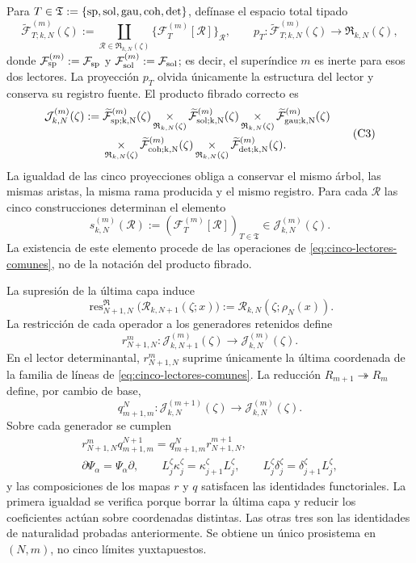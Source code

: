 Para
\(T\in\mathfrak T:=\{{\rm sp},{\rm sol},{\rm gau},{\rm coh},{\rm det}\}\),
defínase el espacio total tipado
\[
 \widetilde{\mathcal F}_{T;k,N}^{(m)}(\zeta)
 :=\coprod_{\mathscr R\in\mathfrak R_{k,N}(\zeta)}
   \{\mathcal F_T^{(m)}[\mathscr R]\}_{\mathscr R},
 \qquad
 p_T:\widetilde{\mathcal F}_{T;k,N}^{(m)}(\zeta)
      \longrightarrow\mathfrak R_{k,N}(\zeta),
\]
donde
\(\mathcal F_{\rm sp}^{(m)}:=\mathcal F_{\rm sp}\) y
\(\mathcal F_{\rm sol}^{(m)}:=\mathcal F_{\rm sol}\); es decir, el
superíndice \(m\) es inerte para esos dos lectores.
La proyección \(p_T\) olvida únicamente la estructura del lector y conserva
su registro fuente. El producto fibrado correcto es
\[
\begin{aligned}
 \mathcal J_{k,N}^{(m)}(\zeta):={}&
 \widetilde{\mathcal F}_{\rm sp;k,N}^{(m)}(\zeta)
 \mathop{\times}_{\mathfrak R_{k,N}(\zeta)}
 \widetilde{\mathcal F}_{\rm sol;k,N}^{(m)}(\zeta)
 \mathop{\times}_{\mathfrak R_{k,N}(\zeta)}
 \widetilde{\mathcal F}_{\rm gau;k,N}^{(m)}(\zeta)\\
 &\mathop{\times}_{\mathfrak R_{k,N}(\zeta)}
 \widetilde{\mathcal F}_{\rm coh;k,N}^{(m)}(\zeta)
 \mathop{\times}_{\mathfrak R_{k,N}(\zeta)}
 \widetilde{\mathcal F}_{\rm det;k,N}^{(m)}(\zeta).
\end{aligned}
\tag{C3}
\label{eq:constructor-correlativo}
\]
La igualdad de las cinco proyecciones obliga a conservar el mismo árbol, las
mismas aristas, la misma rama producida y el mismo registro. Para cada
\(\mathscr R\) las cinco construcciones determinan el elemento
\[
 s_{k,N}^{(m)}(\mathscr R)
 :=(\mathcal F_T^{(m)}[\mathscr R])_{T\in\mathfrak T}
 \in\mathcal J_{k,N}^{(m)}(\zeta).
\]
La existencia de este elemento procede de las operaciones de
\eqref{eq:cinco-lectores-comunes}, no de la
notación del producto fibrado.

La supresión de la última capa induce
\[
 \operatorname{res}^{\mathfrak R}_{N+1,N}
 \bigl(\mathscr R_{k,N+1}(\zeta;x)\bigr)
 :=\mathscr R_{k,N}(\zeta;\rho_N(x)).
\]
La restricción de cada operador a los generadores retenidos define
\[
 r^m_{N+1,N}:\mathcal J_{k,N+1}^{(m)}(\zeta)
 \longrightarrow\mathcal J_{k,N}^{(m)}(\zeta).
\]
En el lector determinantal, \(r^m_{N+1,N}\) suprime únicamente la última
coordenada de la familia de líneas de
\eqref{eq:cinco-lectores-comunes}. La reducción
\(R_{m+1}\twoheadrightarrow R_m\) define, por cambio de base,
\[
 q^N_{m+1,m}:\mathcal J_{k,N}^{(m+1)}(\zeta)
 \longrightarrow\mathcal J_{k,N}^{(m)}(\zeta).
\]
Sobre cada generador se cumplen
\[
\begin{gathered}
 r^m_{N+1,N}q^{N+1}_{m+1,m}
 =q^N_{m+1,m}r^{m+1}_{N+1,N},\\
 \partial\Psi_\alpha=\Psi_\alpha\partial,
 \qquad L_j^\zeta\kappa_j^\zeta
       =\kappa_{j+1}^\zeta L_j^\zeta,
 \qquad L_j^\zeta\delta_j^\zeta
       =\delta_{j+1}^\zeta L_j^\zeta,
\end{gathered}
\tag{C4}
\label{eq:naturalidad-D}
\]
y las composiciones de los mapas \(r\) y \(q\) satisfacen las identidades
functoriales. La primera igualdad se verifica porque borrar la última capa y
reducir los coeficientes actúan sobre coordenadas distintas. Las otras tres
son las identidades de naturalidad probadas anteriormente. Se obtiene un único
prosistema en \((N,m)\), no cinco límites yuxtapuestos.

